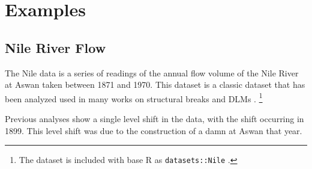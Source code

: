 \documentclass{article}
\newcommand{\RLang}{\textsf{R}}
\begin{document}
\section{Examples}
\label{sec:examples}


\subsection{Nile River Flow}
\label{sec:nile}

The Nile data is a series of readings of the annual flow volume of the Nile River at Aswan taken between 1871 and 1970.
This dataset is a classic dataset that has been analyzed used in many works on structural breaks and DLMs \parencites{Cobb1978}{Balke1993}{JongPenzer1998}{DurbinKoopman2001}{DurbinKoopman2012}.%
\footnote{The dataset is included with base \RLang{} as \texttt{datasets::Nile} \parencite{RCT2013}.}

Previous analyses show a single level shift in the data, with the shift occurring in 1899.
This level shift was due to the construction of a damn at Aswan that year.
\end{document}
